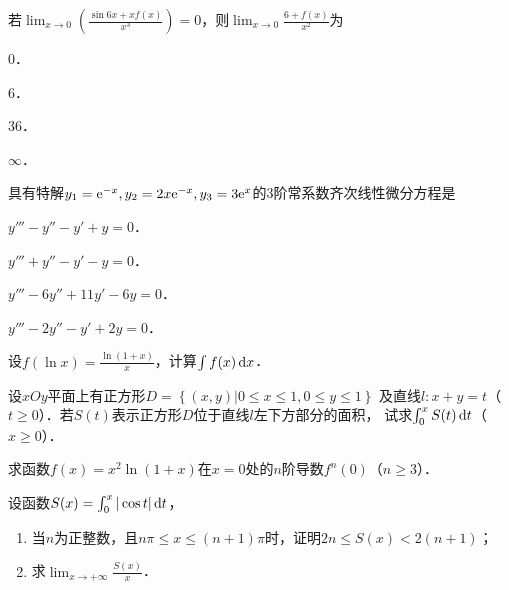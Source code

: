 \documentclass[plain,noanswer,medmath]{../../template/jnuexam}
\begin{document}


\begin{problem}
若$\lim_{x \to 0} \left(\frac{\sin 6x + xf(x)}{x^3} \right) = 0$，则$\lim_{x \to 0} \frac{6 + f(x)}{x^2}$为\pickout{}
\begin{abcd}
\item $0$．
\item $6$．
\item $36$．
\item $\infty$．
\end{abcd}
\end{problem}


\begin{problem}
具有特解$y_1 = \mathrm{e}^{- x},y_2 = 2x\mathrm{e}^{- x},y_3 = 3\mathrm{e}^x$的3阶常系数齐次线性微分方程是\pickout{}
\begin{abcd}
\item $y''' - y'' - y' + y = 0$．
\item $y''' + y'' - y' - y = 0$．
\item $y''' - 6y'' + 11y' - 6y = 0$．
\item $y''' - 2y'' - y' + 2y = 0$．
\end{abcd}
\end{problem}



\begin{problem}
设$f(\ln x) = \frac{\ln(1 + x)}{x}$，计算$\int f(x)\mathop{}\!\mathrm{d} x$．
\end{problem}



\begin{problem}
设$xOy$平面上有正方形$D = \left\{(x,y)\left| 0 \le x \le 1,0 \le y \le 1 \right. \right\}$
及直线$l:x + y = t$（$t \ge 0$）．若$S(t)$表示正方形$D$位于直线$l$左下方部分的面积，
试求$\int_0^x S(t)\mathop{}\!\mathrm{d} t$（$x \ge 0$）．
\end{problem}



\begin{problem}
求函数$f(x) = x^2\ln(1 + x)$在$x = 0$处的$n$阶导数$f^n(0)$（$n \ge 3$）．
\end{problem}



\begin{problem}
设函数$S(x) = \int_0^x |\cos t| \mathop{}\!\mathrm{d} t$，
\begin{enumerate}
\item 当$n$为正整数，且$n\pi \le x \le(n + 1)\pi$时，证明$2n \le S(x) < 2(n + 1)$；
\item 求$\lim_{x \to +\infty} \frac{S(x)}{x}$．
\end{enumerate}
\end{problem}
\end{document}
